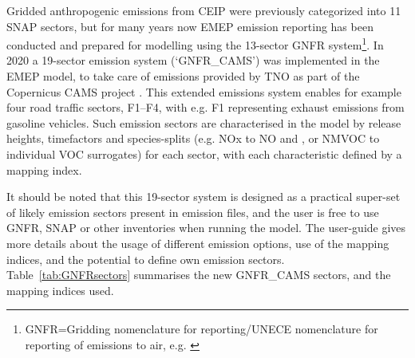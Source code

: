 Gridded anthropogenic emissions from CEIP
were previously categorized into 11
SNAP sectors, but for many years now EMEP emission reporting has been conducted and prepared for
modelling using the 13-sector
GNFR system\footnote{
GNFR=Gridding nomenclature for reporting/UNECE nomenclature for reporting of emissions to air,
e.g. \citealt{CEIP2020:GNFR}}.
In 2020 a 19-sector emission system (`GNFR\_CAMS') was implemented in the EMEP model, to take care of
emissions provided by TNO as part of the Copernicus CAMS project \citep{GranierCAMS2019,Kuenen2021}. This extended emissions system
enables for example four road traffic sectors, F1--F4, with e.g. F1
 representing exhaust emissions from gasoline vehicles.
Such emission sectors are characterised in the model by
release heights, timefactors and species-splits (e.g. NOx to NO and
, or NMVOC to individual VOC surrogates) for each sector, with each
characteristic defined by a mapping index. 

It should be noted that this 19-sector system is designed as a practical super-set of likely emission sectors present in emission files, and the  user is free to use GNFR, SNAP or other inventories when running the model. The user-guide gives more details about the usage of different emission options, use of the mapping indices, and the potential to define own emission sectors.
Table~\ref{tab:GNFRsectors} summarises the new GNFR\_CAMS sectors,
and the mapping indices used.


